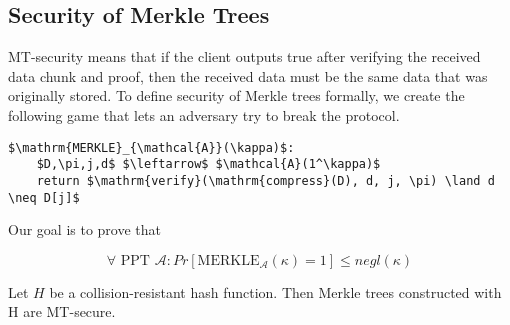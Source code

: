 \subsection{Security of Merkle Trees}

MT-security means that if the client outputs true after verifying the received data chunk and proof, then the received data must be the same data that was originally stored.
To define security of Merkle trees formally, we create the following game that lets an adversary try to break the protocol.

\begin{center}
    \begin{lstlisting}[mathescape=true]
$\mathrm{MERKLE}_{\mathcal{A}}(\kappa)$:
    $D,\pi,j,d$ $\leftarrow$ $\mathcal{A}(1^\kappa)$
    return $\mathrm{verify}(\mathrm{compress}(D), d, j, \pi) \land d \neq D[j]$
    \end{lstlisting}
\end{center}

Our goal is to prove that

$$
\forall \text{ PPT } \mathcal{A}: Pr[\mathrm{MERKLE}_{\mathcal{A}}(\kappa) = 1] \leq negl(\kappa)
$$
\begin{theorem}
Let $H$ be a collision-resistant hash function. Then Merkle trees constructed with H are MT-secure.
\end{theorem}

